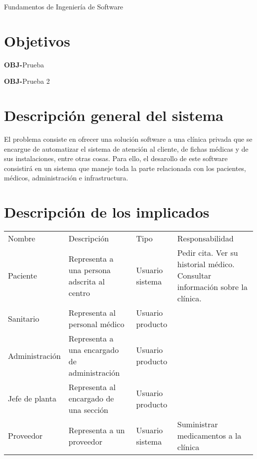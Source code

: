 \documentclass[11pt,a4paper]{article}
\newcounter{ObjCounter}
\newcommand{\obj}[1]{\addtocounter{ObjCounter}{1}\textbf{\rmfamily OBJ-\theObjCounter}\quad#1\\}
\begin{document}
{\Huge{Fundamentos de Ingeniería de Software}}

\section{Objetivos} %
\label{sec:estudio_del_dominio_del_problema}

\obj{Prueba}
\obj{Prueba 2}



\section{Descripción general del sistema} %
\label{sec:descripción_general_del_sisetema}

El problema consiste en ofrecer una solución software a una clínica privada que se encargue de automatizar el sistema de atención al cliente, de fichas médicas y de sus instalaciones, entre otras cosas. Para ello, el desarollo de este software consistirá en un sistema que maneje toda la parte relacionada con los pacientes, médicos, administración e infrastructura.

\section{Descripción de los implicados} %
\label{sec:descripción_de_los_implicados}

	\begin{tabular}{lp{3cm}lp{4cm}}
		Nombre & Descripción & Tipo & Responsabilidad \\
		Paciente & Representa a una persona adscrita al centro & Usuario sistema & Pedir cita. Ver su historial médico. Consultar información sobre la clínica. \\
		Sanitario & Representa al personal médico & Usuario producto & \\
		Administración & Representa a una encargado de administración & Usuario producto & \\
		Jefe de planta & Representa al encargado de una sección & Usuario producto & \\
		Proveedor & Representa a un proveedor & Usuario sistema & Suministrar medicamentos a la clínica
	\end{tabular}




\end{document}
